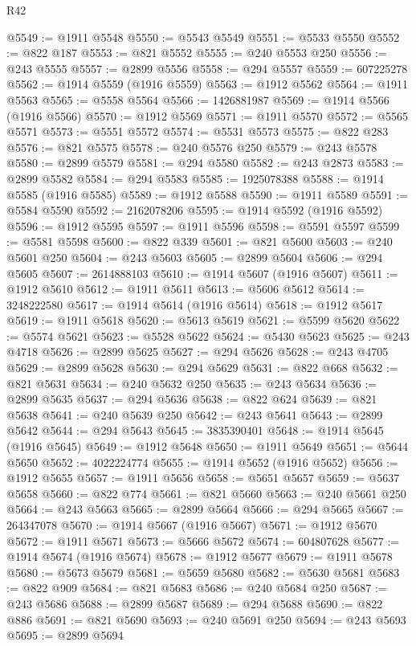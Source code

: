 \begin{lexlean}{R42}
\begin{coremodule}
{@5549 := @1911 @5548
@5550 := @5543 @5549
@5551 := @5533 @5550
@5552 := @822 @187
@5553 := @821 @5552
@5555 := @240 @5553 @250
@5556 := @243 @5555
@5557 := @2899 @5556
@5558 := @294 @5557
@5559 := 607225278
@5562 := @1914 @5559 (@1916 @5559)
@5563 := @1912 @5562
@5564 := @1911 @5563
@5565 := @5558 @5564
@5566 := 1426881987
@5569 := @1914 @5566 (@1916 @5566)
@5570 := @1912 @5569
@5571 := @1911 @5570
@5572 := @5565 @5571
@5573 := @5551 @5572
@5574 := @5531 @5573
@5575 := @822 @283
@5576 := @821 @5575
@5578 := @240 @5576 @250
@5579 := @243 @5578
@5580 := @2899 @5579
@5581 := @294 @5580
@5582 := @243 @2873
@5583 := @2899 @5582
@5584 := @294 @5583
@5585 := 1925078388
@5588 := @1914 @5585 (@1916 @5585)
@5589 := @1912 @5588
@5590 := @1911 @5589
@5591 := @5584 @5590
@5592 := 2162078206
@5595 := @1914 @5592 (@1916 @5592)
@5596 := @1912 @5595
@5597 := @1911 @5596
@5598 := @5591 @5597
@5599 := @5581 @5598
@5600 := @822 @339
@5601 := @821 @5600
@5603 := @240 @5601 @250
@5604 := @243 @5603
@5605 := @2899 @5604
@5606 := @294 @5605
@5607 := 2614888103
@5610 := @1914 @5607 (@1916 @5607)
@5611 := @1912 @5610
@5612 := @1911 @5611
@5613 := @5606 @5612
@5614 := 3248222580
@5617 := @1914 @5614 (@1916 @5614)
@5618 := @1912 @5617
@5619 := @1911 @5618
@5620 := @5613 @5619
@5621 := @5599 @5620
@5622 := @5574 @5621
@5623 := @5528 @5622
@5624 := @5430 @5623
@5625 := @243 @4718
@5626 := @2899 @5625
@5627 := @294 @5626
@5628 := @243 @4705
@5629 := @2899 @5628
@5630 := @294 @5629
@5631 := @822 @668
@5632 := @821 @5631
@5634 := @240 @5632 @250
@5635 := @243 @5634
@5636 := @2899 @5635
@5637 := @294 @5636
@5638 := @822 @624
@5639 := @821 @5638
@5641 := @240 @5639 @250
@5642 := @243 @5641
@5643 := @2899 @5642
@5644 := @294 @5643
@5645 := 3835390401
@5648 := @1914 @5645 (@1916 @5645)
@5649 := @1912 @5648
@5650 := @1911 @5649
@5651 := @5644 @5650
@5652 := 4022224774
@5655 := @1914 @5652 (@1916 @5652)
@5656 := @1912 @5655
@5657 := @1911 @5656
@5658 := @5651 @5657
@5659 := @5637 @5658
@5660 := @822 @774
@5661 := @821 @5660
@5663 := @240 @5661 @250
@5664 := @243 @5663
@5665 := @2899 @5664
@5666 := @294 @5665
@5667 := 264347078
@5670 := @1914 @5667 (@1916 @5667)
@5671 := @1912 @5670
@5672 := @1911 @5671
@5673 := @5666 @5672
@5674 := 604807628
@5677 := @1914 @5674 (@1916 @5674)
@5678 := @1912 @5677
@5679 := @1911 @5678
@5680 := @5673 @5679
@5681 := @5659 @5680
@5682 := @5630 @5681
@5683 := @822 @909
@5684 := @821 @5683
@5686 := @240 @5684 @250
@5687 := @243 @5686
@5688 := @2899 @5687
@5689 := @294 @5688
@5690 := @822 @886
@5691 := @821 @5690
@5693 := @240 @5691 @250
@5694 := @243 @5693
@5695 := @2899 @5694
}
\end{coremodule}
\end{lexlean}
